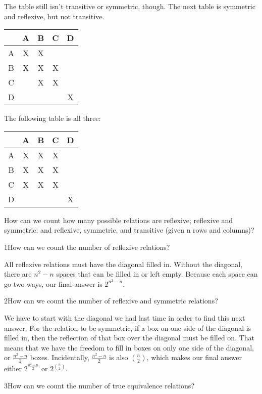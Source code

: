 The table still isn't transitive or symmetric, though. The next table is symmetric and reflexive, but not transitive.
\begin{center}
\begin{tabular} {c|c c c c}
& A & B & C & D \\
\hline
A & X & X &  &  \\
B & X & X & X &  \\
C &  & X & X &  \\
D &  &  &  & X \\
\end{tabular}
\end{center}
The following table is all three:
\begin{center}
\begin{tabular} {c|c c c c}
& A & B & C & D \\
\hline
A & X & X & X &  \\
B & X & X & X &  \\
C & X & X & X &  \\
D &  &  &  & X \\
\end{tabular}
\end{center}
How can we count how many possible relations are reflexive; reflexive and symmetric; and reflexive, symmetric, and transitive (given n rows and columns)?
\begin{problem}1{How can we count the number of reflexive relations?}\end{problem}
All reflexive relations must have the diagonal filled in. Without the diagonal, there are \(n^{2} - n\) spaces that can be filled in or left empty. Because each space can go two ways, our final answer is \(2^{n^{2}-n}\).
\begin{problem}2{How can we count the number of reflexive and symmetric relations?}\end{problem}
We have to start with the diagonal we had last time in order to find this next answer. For the relation to be symmetric, if a box on one side of the diagonal is filled in, then the reflection of that box over the diagonal must be filled on. That means that we have the freedom to fill in boxes on only one side of the diagonal, or \(\frac{n^{2}-n}{2}\) boxes. Incidentally, \(\frac{n^{2}-n}{2}\) is also \(\binom{n}{2}\), which makes our final answer either \(2^{\frac{n^{2}-n}{2}}\) or \(2^{\binom{n}{2}}\).
\begin{problem}3{How can we count the number of true equivalence relations?}\end{problem}
